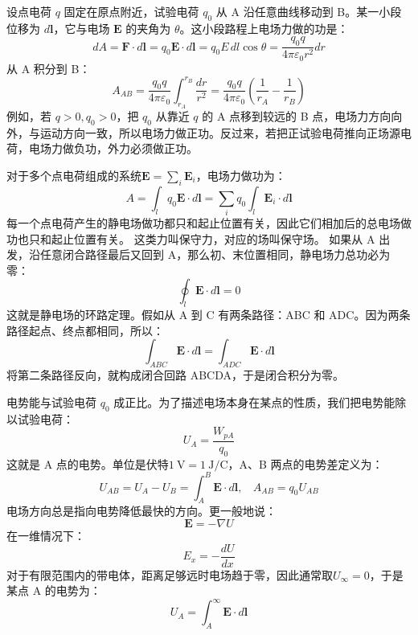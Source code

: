 \documentclass[lang=cn,11pt]{elegantbook}
\begin{document}
设点电荷 \(q\) 固定在原点附近，试验电荷 \(q_0\) 从 A 沿任意曲线移动到 B。某一小段位移为 \(d\mathbf l\)，它与电场 \(\mathbf E\) 的夹角为 \(\theta\)。这小段路程上电场力做的功是：
\[
dA=\mathbf F\cdot d\mathbf l
=q_0\mathbf E\cdot d\mathbf l
=q_0E\,dl\cos\theta=
\frac{q_0q}{4\pi\varepsilon_0r^2}dr
\]
从 A 积分到 B：
\[A_{AB}=\frac{q_0q}{4\pi\varepsilon_0}\int_{r_A}^{r_B}\frac{dr}{r^2}=\frac{q_0q}{4\pi\varepsilon_0}\left(\frac{1}{r_A}-\frac{1}{r_B}\right)\]
例如，若 \(q>0,q_0>0\)，把 \(q_0\) 从靠近 \(q\) 的 A 点移到较远的 B 点，电场力方向向外，与运动方向一致，所以电场力做正功。反过来，若把正试验电荷推向正场源电荷，电场力做负功，外力必须做正功。
\begin{theorem}
对于多个点电荷组成的系统\(\mathbf E=\sum_i\mathbf E_i\)，电场力做功为：
\[A=\int_l q_0\mathbf E\cdot d\mathbf l=\sum_i q_0\int_l\mathbf E_i\cdot d\mathbf l\]
每一个点电荷产生的静电场做功都只和起止位置有关，因此它们相加后的总电场做功也只和起止位置有关。
这类力叫保守力，对应的场叫保守场。
如果从 A 出发，沿任意闭合路径最后又回到 A，那么初、末位置相同，静电场力总功必为零：
\[
\boxed{
\oint_l \mathbf E\cdot d\mathbf l=0
}
\]这就是静电场的环路定理。假如从 A 到 C 有两条路径：ABC 和 ADC。因为两条路径起点、终点都相同，所以：
\[\int_{ABC}\mathbf E\cdot d\mathbf l=\int_{ADC}\mathbf E\cdot d\mathbf l\]将第二条路径反向，就构成闭合回路 ABCDA，于是闭合积分为零。
\end{theorem}

\begin{definition}[电势与电势差]
电势能与试验电荷 \(q_0\) 成正比。为了描述电场本身在某点的性质，我们把电势能除以试验电荷：
\[\boxed{U_A=\frac{W_{pA}}{q_0}}\]
这就是 A 点的电势。单位是伏特\(1\ \mathrm V=1\ \mathrm{J/C}\)，A、B 两点的电势差定义为：
\[
\boxed{
U_{AB}=U_A-U_B=\int_A^B\mathbf E\cdot d\mathbf l,~~~~
A_{AB}=q_0U_{AB}
}
\]
电场方向总是指向电势降低最快的方向。更一般地说：
\[
\boxed{\mathbf E=-\nabla U}
\]在一维情况下：
\[
E_x=-\frac{dU}{dx}
\]对于有限范围内的带电体，距离足够远时电场趋于零，因此通常取\(U_\infty=0\)，于是某点 A 的电势为：
\[
\boxed{
U_A=\int_A^\infty\mathbf E\cdot d\mathbf l
}
\]
\end{definition}
\end{document}
